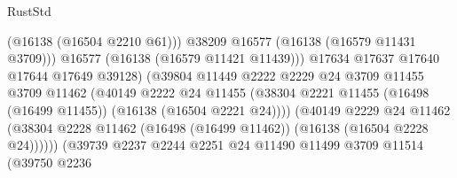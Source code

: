 \begin{lexlean}{RustStd}
\begin{coremodule}
                                                (@16138 (@16504 @2210 @61)))
                                              @38209
                                              @16577
                                              (@16138 (@16579 @11431 @3709)))
                                            @16577
                                            (@16138 (@16579 @11421 @11439)))
                                          @17634
                                          @17637
                                          @17640
                                          @17644
                                          @17649
                                          @39128)
                                        (@39804
                                          @11449
                                          @2222
                                          @2229
                                          @24
                                          @3709
                                          @11455
                                          @3709
                                          @11462
                                          (@40149
                                            @2222
                                            @24
                                            @11455
                                            (@38304
                                              @2221
                                              @11455
                                              (@16498 (@16499 @11455))
                                              (@16138 (@16504 @2221 @24))))
                                          (@40149
                                            @2229
                                            @24
                                            @11462
                                            (@38304
                                              @2228
                                              @11462
                                              (@16498 (@16499 @11462))
                                              (@16138 (@16504 @2228 @24))))))
                                      (@39739
                                        @2237
                                        @2244
                                        @2251
                                        @24
                                        @11490
                                        @11499
                                        @3709
                                        @11514
                                        (@39750
                                          @2236

\end{coremodule}
\end{lexlean}
